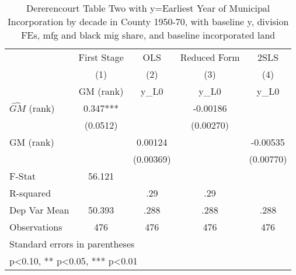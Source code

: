 \begin{table}[htbp]\centering
\def\sym#1{\ifmmode^{#1}\else\(^{#1}\)\fi}
\caption{Dererencourt Table Two with y=Earliest Year of Municipal Incorporation by decade in County 1950-70, with baseline y, division FEs, mfg and black mig share, and baseline incorporated land}
\begin{tabular}{l*{4}{c}}
\toprule
                    & First Stage   &         OLS   &Reduced Form   &        2SLS   \\
                    &\multicolumn{1}{c}{(1)}&\multicolumn{1}{c}{(2)}&\multicolumn{1}{c}{(3)}&\multicolumn{1}{c}{(4)}\\
                    &\multicolumn{1}{c}{GM  (rank)}&\multicolumn{1}{c}{y\_L0}&\multicolumn{1}{c}{y\_L0}&\multicolumn{1}{c}{y\_L0}\\
\midrule
$\hat{GM}$ (rank)   &       0.347***&               &    -0.00186   &               \\
                    &    (0.0512)   &               &   (0.00270)   &               \\
\addlinespace
GM  (rank)          &               &     0.00124   &               &    -0.00535   \\
                    &               &   (0.00369)   &               &   (0.00770)   \\
\midrule
F-Stat              &      56.121   &               &               &               \\
R-squared           &               &         .29   &         .29   &               \\
Dep Var Mean        &      50.393   &        .288   &        .288   &        .288   \\
Observations        &         476   &         476   &         476   &         476   \\
\bottomrule
\multicolumn{5}{l}{\footnotesize Standard errors in parentheses}\\
\multicolumn{5}{l}{\footnotesize * p<0.10, ** p<0.05, *** p<0.01}\\
\end{tabular}
\end{table}
